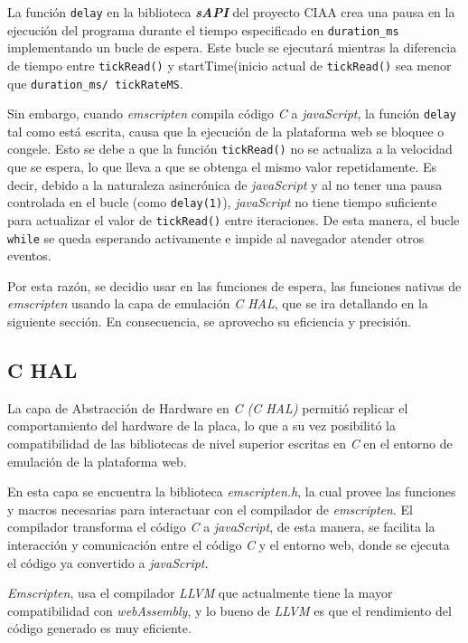La función \texttt{delay} en la biblioteca \textit{\textbf{sAPI}} del proyecto CIAA crea una pausa en la ejecución del programa durante el tiempo especificado en \texttt{duration\_ms} implementando un bucle de espera. Este bucle se ejecutará mientras la diferencia de tiempo entre \texttt{tickRead()} y startTime(inicio actual de \texttt{tickRead()} sea menor que \texttt{duration\_ms/ tickRateMS}.

Sin embargo, cuando \textit{emscripten} compila código \textit{C} a \textit{javaScript}, la función \texttt{delay} tal como está escrita, causa que la ejecución de la plataforma web se bloquee o congele. Esto se debe a que la función \texttt{tickRead()} no se actualiza a la velocidad que se espera, lo que lleva a que se obtenga el mismo valor repetidamente. Es decir, debido a la naturaleza asincrónica de \textit{javaScript} y al no tener una pausa controlada en el bucle (como \texttt{delay(1)}), \textit{javaScript} no tiene tiempo suficiente para actualizar el valor de \texttt{tickRead()} entre iteraciones. De esta manera,  el bucle \texttt{while} se queda esperando activamente e impide al navegador atender otros eventos.

Por esta razón, se decidio usar en las funciones de espera,  las funciones nativas de \textit{emscripten} usando la capa de emulación \textit{C HAL}, que se ira detallando en la siguiente sección. En consecuencia, se aprovecho su eficiencia y precisión.


\subsection{C HAL}

La capa de Abstracción de Hardware en \textit{C (C HAL)}  permitió replicar el comportamiento del hardware de la placa, lo que a su vez posibilitó la compatibilidad de las bibliotecas de nivel superior escritas en \textit{C} en el entorno de emulación de la plataforma web.

En esta capa se encuentra la biblioteca \textit{emscripten.h}, la cual provee las funciones y macros necesarias para interactuar con el compilador de \textit{emscripten}. El compilador transforma el código \textit{C} a \textit{javaScript}, de esta manera, se facilita la interacción y comunicación entre el código \textit{C} y el entorno web, donde se ejecuta el código ya convertido a \textit{javaScript}.

\textit{Emscripten}, usa el compilador \textit{LLVM} que actualmente tiene la mayor compatibilidad con \textit{webAssembly}, y lo bueno de \textit{LLVM} es que el rendimiento del código generado es muy eficiente. 

